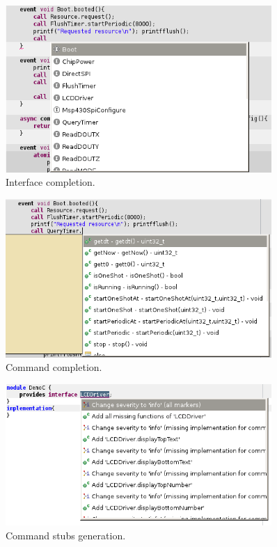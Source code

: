 \begin{figure}[h]
  \centering
  \includegraphics[width=0.9\textwidth]{img/eclipse_compl4.png}
  \caption{Interface completion.}
\end{figure}

\begin{figure}[h]
  \centering
  \includegraphics[width=0.9\textwidth]{img/eclipse_compl5.png}
  \caption{Command completion.}
\end{figure}

\begin{figure}[h]
  \centering
  \includegraphics[width=0.9\textwidth]{img/eclipse_compl6.png}
  \caption{Command stubs generation.}
  \label{fig:last_compl}
\end{figure}

